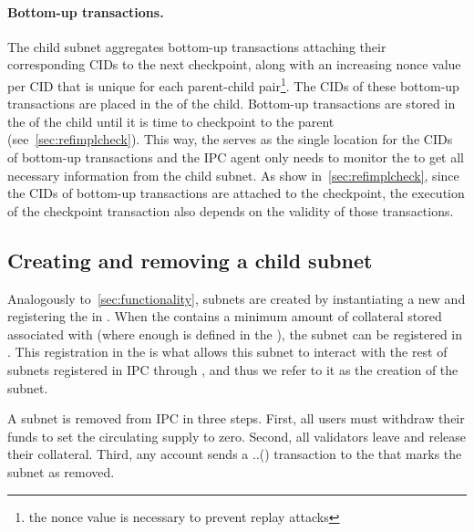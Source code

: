 \paragraph{Bottom-up transactions.}  
The child subnet aggregates bottom-up transactions attaching their corresponding CIDs to the next checkpoint, along with an increasing nonce value per CID that is unique for each parent-child pair\footnote{the nonce value is necessary to prevent replay attacks}. The CIDs of these bottom-up transactions are placed in the \gw of the child. Bottom-up transactions are stored in the \gw of the child until it is time to checkpoint to the parent (see~\cref{sec:refimplcheck}). This way, the \gw serves as the single location for the CIDs of bottom-up transactions and the IPC agent only needs to monitor the \gw to get all necessary information from the child subnet. As show in~\cref{sec:refimplcheck}, since the CIDs of bottom-up transactions are attached to the checkpoint, the execution of the checkpoint transaction also depends on the validity of those transactions. 


\subsection{Creating and removing a child subnet} Analogously to~\cref{sec:functionality}, subnets are created by instantiating a new \sa and registering the \sa in \gw. When the \gw contains a minimum amount of collateral stored associated with \sa (where enough is defined in the \gw), the subnet can be registered in \gw. This registration in the \gw is what allows this subnet to interact with the rest of subnets registered in IPC through \gw, and thus we refer to it as the creation of the subnet. 

A subnet  is removed from IPC in three steps. First, all users must withdraw their funds to set the circulating supply to zero. Second, all validators leave and release their collateral. Third, any account sends a .\gw.() transaction to the \gw that marks the subnet as removed.


